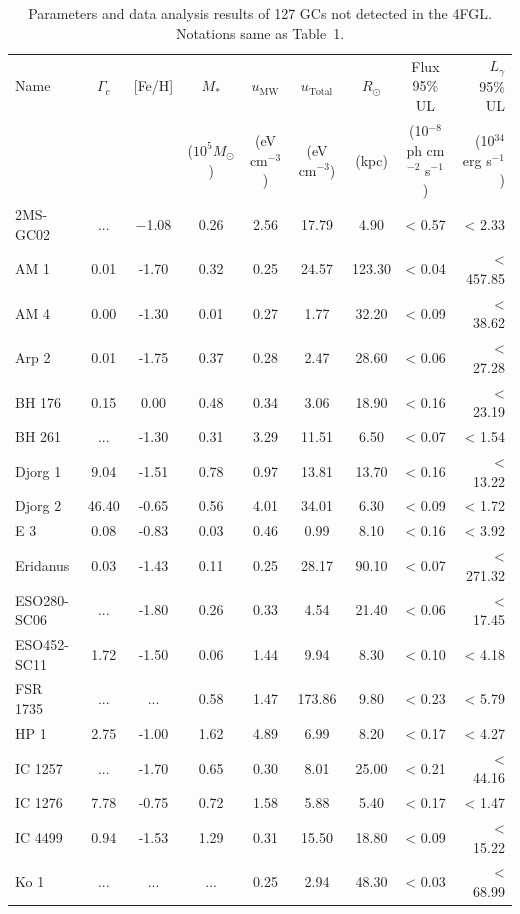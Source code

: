 \documentclass[doublespace,draft,nopageskip]{VTthesis} %
\begin{document}
\begin{appendices}
\begin{table}
\centering
\caption{Parameters and data analysis results of 127 GCs not detected in the 4FGL. Notations same as Table~1.}\label{tab:nondetect}
\begin{tabular}{lcccccccr}
\hline
Name &  $\Gamma_c$& [Fe/H]  & $M_*$ & $u_\text{MW}$ & $u_\text{Total}$ & $R_\odot$ & Flux 95\% UL & $L_\gamma$ 95\% UL \\
 & &  & ($10^5 M_\odot$) & (eV cm$^{-3}$) & (eV cm$^{-3}$) & (kpc) & (10$^{-8}$ ph cm$^{-2}$ s$^{-1}$)  & (10$^{34}$ erg s$^{-1}$)\\
\hline
2MS-GC02 & ... & $-$1.08 & 0.26 & 2.56 & 17.79 & 4.90 & < 0.57 & < 2.33\\
AM 1 & 0.01 & -1.70 & 0.32 & 0.25 & 24.57 & 123.30 & < 0.04 & < 457.85\\
AM 4 & 0.00 & -1.30 & 0.01 & 0.27 & 1.77 & 32.20 & < 0.09 & < 38.62\\
Arp 2 & 0.01 & -1.75 & 0.37 & 0.28 & 2.47 & 28.60 & < 0.06 & < 27.28\\
BH 176 & 0.15 & 0.00 & 0.48 & 0.34 & 3.06 & 18.90 & < 0.16 & < 23.19\\
BH 261 & ... & -1.30 & 0.31 & 3.29 & 11.51 & 6.50 & < 0.07 & < 1.54\\
Djorg 1 & 9.04 & -1.51 & 0.78 & 0.97 & 13.81 & 13.70 & < 0.16 & < 13.22\\
Djorg 2 & 46.40 & -0.65 & 0.56 & 4.01 & 34.01 & 6.30 & < 0.09 & < 1.72\\
E 3 & 0.08 & -0.83 & 0.03 & 0.46 & 0.99 & 8.10 & < 0.16 & < 3.92\\
Eridanus & 0.03 & -1.43 & 0.11 & 0.25 & 28.17 & 90.10 & < 0.07 & < 271.32\\
ESO280-SC06 & ... & -1.80 & 0.26 & 0.33 & 4.54 & 21.40 & < 0.06 & < 17.45\\
ESO452-SC11 & 1.72 & -1.50 & 0.06 & 1.44 & 9.94 & 8.30 & < 0.10 & < 4.18\\
FSR 1735 & ... & ... & 0.58 & 1.47 & 173.86 & 9.80 & < 0.23 & < 5.79\\
HP 1 & 2.75 & -1.00 & 1.62 & 4.89 & 6.99 & 8.20 & < 0.17 & < 4.27\\
IC 1257 & ... & -1.70 & 0.65 & 0.30 & 8.01 & 25.00 & < 0.21 & < 44.16\\
IC 1276 & 7.78 & -0.75 & 0.72 & 1.58 & 5.88 & 5.40 & < 0.17 & < 1.47\\
IC 4499 & 0.94 & -1.53 & 1.29 & 0.31 & 15.50 & 18.80 & < 0.09 & < 15.22\\
Ko 1 & ... & ... & ... & 0.25 & 2.94 & 48.30 & < 0.03 & < 68.99\\

\end{tabular}
\end{table}
\end{appendices}
\end{document}
